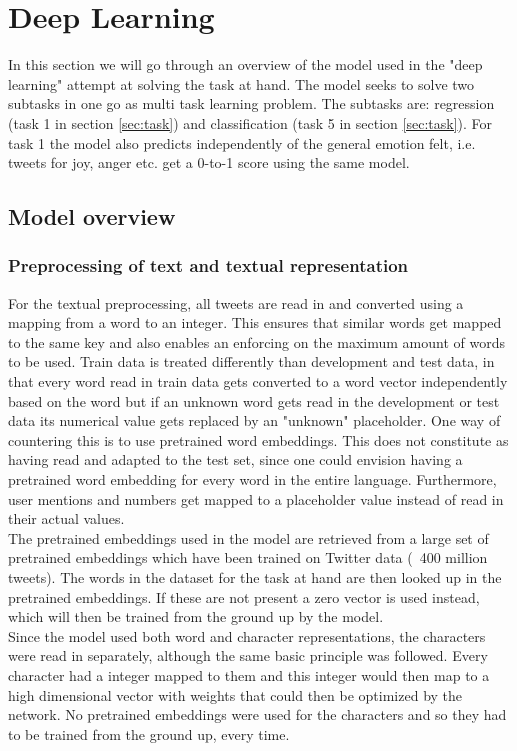
\section{Deep Learning} \label{sec:deep}
In this section we will go through an overview of the model used in the "deep learning" attempt at solving the task at hand. The model seeks to solve two subtasks in one go as multi task learning problem. The subtasks are: regression (task 1 in section \ref{sec:task}) and classification (task 5 in section \ref{sec:task}). For task 1 the model also predicts independently of the general emotion felt, i.e. tweets for joy, anger etc. get a 0-to-1 score using the same model.

\subsection{Model overview}

\subsubsection{Preprocessing of text and textual representation} \label{sec:preprop}
For the textual preprocessing, all tweets are read in and converted using a mapping from a word to an integer. This ensures that similar words get mapped to the same key and also enables an enforcing on the maximum amount of words to be used. Train data is treated differently than development and test data, in that every word read in train data gets converted to a word vector independently based on the word but if an unknown word gets read in the development or test data its numerical value gets replaced by an "unknown" placeholder. One way of countering this is to use pretrained word embeddings. This does not constitute as having read and adapted to the test set, since one could envision having a pretrained word embedding for every word in the entire language. Furthermore, user mentions and numbers get mapped to a placeholder value instead of read in their actual values.\\
The pretrained embeddings used in the model are retrieved from a large set of pretrained embeddings which have been trained on Twitter data (~400 million tweets). The words in the dataset for the task at hand are then looked up in the pretrained embeddings. If these are not present a zero vector is used instead, which will then be trained from the ground up by the model.\\
Since the model used both word and character representations, the characters were read in separately, although the same basic principle was followed. Every character had a integer mapped to them and this integer would then map to a high dimensional vector with weights that could then be optimized by the network. No pretrained embeddings were used for the characters and so they had to be trained from the ground up, every time.

